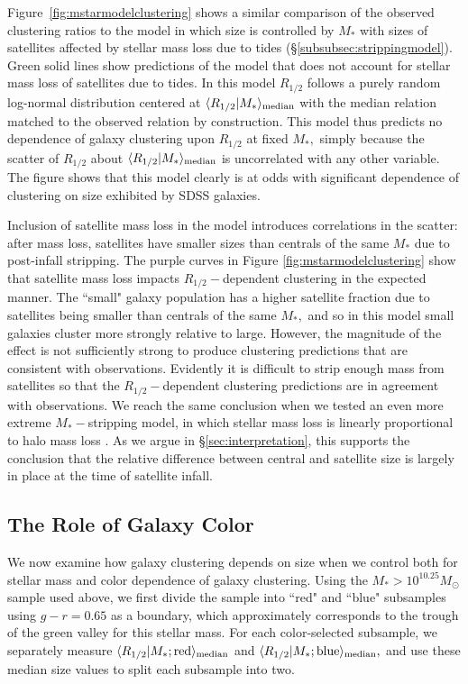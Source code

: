\documentclass[usenatbib,usegraphicx,letterpaper]{mn2e}
\newcommand{\rhalf}{R_{1/2}}
\newcommand{\mstar}{M_{\ast}}
\newcommand{\median}[2]{\langle{#1}\vert{#2}\rangle_{\rm median}}
\newcommand{\msun}{M_\odot}
\begin{document}
Figure~\ref{fig:mstarmodelclustering} shows a similar comparison of the observed clustering ratios to the model
in which size is controlled by $\mstar$ with sizes of satellites affected by stellar mass loss due to tides (\S\ref{subsubsec:strippingmodel}). Green solid lines show predictions of the model that does not account for stellar
mass loss of satellites due to tides. In this model $\rhalf$ follows a purely random log-normal distribution centered at $\median{\rhalf}{\mstar}$ with the median relation matched to the observed relation by construction.  This model thus predicts no dependence of galaxy clustering upon $\rhalf$ at fixed $\mstar,$ simply because the scatter of $\rhalf$ about $\median{\rhalf}{\mstar}$ is uncorrelated with any other variable. The figure shows that this model clearly is at odds with significant dependence of clustering on size exhibited by SDSS galaxies. 

Inclusion of satellite mass loss in the model introduces correlations in the scatter: after mass loss, satellites have smaller sizes than centrals of the same $\mstar$ due to post-infall stripping.
The purple curves in Figure \ref{fig:mstarmodelclustering} show that satellite mass loss impacts $\rhalf-$dependent clustering in the expected manner. The ``small" galaxy population has a higher satellite fraction due to satellites being smaller than centrals of the same $\mstar,$ and so in this model small galaxies cluster more strongly relative to large. However, the magnitude of the effect is not sufficiently strong  to produce clustering predictions that are consistent with observations. Evidently it is difficult to strip enough mass from satellites so that the $\rhalf-$dependent clustering predictions are in agreement with observations.  We reach the same conclusion when we tested an even more extreme $\mstar-$stripping model, in which stellar mass loss is linearly proportional to halo mass loss \citep[][Model 1]{watson_etal12}. 
As we argue in \S\ref{sec:interpretation}, this supports the conclusion that the relative difference between central and satellite size is largely in place at the time of satellite infall.

\subsection{The Role of Galaxy Color}
\label{subsec:colormorph}

We now examine how galaxy clustering depends on size when we control both for stellar mass and color dependence of galaxy clustering. Using the $\mstar>10^{10.25}\msun$ sample used above, we first divide the sample into ``red" and ``blue" subsamples using $g-r=0.65$ as a boundary, which approximately corresponds to the trough of the green valley for this stellar mass. For each color-selected subsample, we separately measure $\median{\rhalf}{\mstar; {\rm red}}$ and $\median{\rhalf}{\mstar; {\rm blue}},$ and use these median size values to split each subsample into two.
\end{document}
